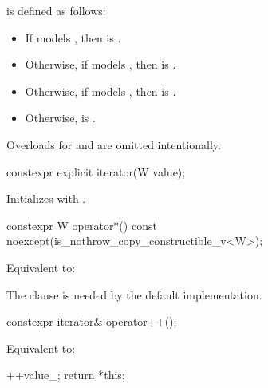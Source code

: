 \pnum
{} is defined as follows:
\begin{itemize}
\item If  models , then
 is .
\item Otherwise, if  models , then
 is .
\item Otherwise, if  models , then
 is .
\item Otherwise,  is .
\end{itemize}

\pnum
\begin{note}
Overloads for  and  are omitted intentionally.
\end{note}

\begin{itemdecl}
constexpr explicit iterator(W value);
\end{itemdecl}

\begin{itemdescr}
\pnum
\effects
Initializes  with .
\end{itemdescr}

\begin{itemdecl}
constexpr W operator*() const noexcept(is_nothrow_copy_constructible_v<W>);
\end{itemdecl}

\begin{itemdescr}
\pnum
\effects
Equivalent to: 

\pnum
\begin{note}
The  clause is needed by the default 
implementation.
\end{note}
\end{itemdescr}

\begin{itemdecl}
constexpr iterator& operator++();
\end{itemdecl}

\begin{itemdescr}
\pnum
\effects
Equivalent to:
\begin{codeblock}
++value_;
return *this;
\end{codeblock}
\end{itemdescr}

